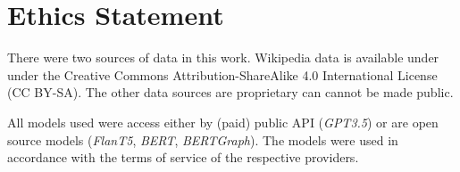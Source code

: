 \section*{Ethics Statement}

There were two sources of data in this work. Wikipedia data is available under under the Creative
Commons Attribution-ShareAlike 4.0 International License (CC BY-SA). The other data sources are proprietary can cannot be made public.

All models used were access either by (paid) public API (\emph{GPT3.5}) or are open source models (\emph{FlanT5}, \emph{BERT}, \emph{BERTGraph}). The models were used in accordance with the terms of service of the respective providers.